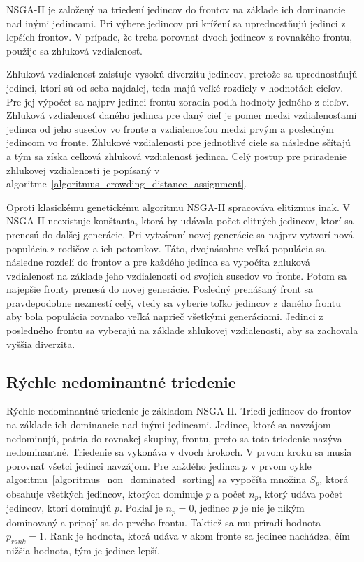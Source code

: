 NSGA-II je založený na triedení jedincov do frontov na základe ich dominancie nad inými jedincami.
Pri výbere jedincov pri krížení sa uprednostňujú jedinci z lepších frontov.
V prípade, že treba porovnať dvoch jedincov z rovnakého frontu, použije sa zhluková vzdialenosť.

Zhluková vzdialenosť zaisťuje vysokú diverzitu jedincov, pretože sa uprednostňujú jedinci, ktorí sú od seba najďalej, teda majú veľké rozdiely v hodnotách cieľov.
Pre jej výpočet sa najprv jedinci frontu zoradia podľa hodnoty jedného z cieľov.
Zhluková vzdialenosť daného jedinca pre daný cieľ je pomer medzi vzdialenosťami jedinca od jeho susedov vo fronte a vzdialenosťou medzi prvým a posledným jedincom vo fronte.
Zhlukové vzdialenosti pre jednotlivé ciele sa následne sčítajú a tým sa získa celková zhluková vzdialenosť jedinca.
Celý postup pre priradenie zhlukovej vzdialenosti je popísaný v algoritme~\ref{algoritmus_crowding_distance_assignment}.

Oproti klasickému genetickému algoritmu NSGA-II spracováva elitizmus inak.
V NSGA-II neexistuje konštanta, ktorá by udávala počet elitných jedincov, ktorí sa prenesú do ďalšej generácie.
Pri vytváraní novej generácie sa najprv vytvorí nová populácia z rodičov a ich potomkov.
Táto, dvojnásobne veľká populácia sa následne rozdelí do frontov a pre každého jedinca sa vypočíta zhluková vzdialenosť na základe jeho vzdialenosti od svojich susedov vo fronte.
Potom sa najepšie fronty prenesú do novej generácie.
Posledný prenášaný front sa pravdepodobne nezmestí celý, vtedy sa vyberie toľko jedincov z daného frontu aby bola populácia rovnako veľká naprieč všetkými generáciami.
Jedinci z posledného frontu sa vyberajú na základe zhlukovej vzdialenosti, aby sa zachovala vyššia diverzita.

\subsection*{Rýchle nedominantné triedenie}
Rýchle nedominantné triedenie je základom NSGA-II.
Triedi jedincov do frontov na základe ich dominancie nad inými jedincami.
Jedince, ktoré sa navzájom nedominujú, patria do rovnakej skupiny, frontu, preto sa toto triedenie nazýva nedominantné.
Triedenie sa vykonáva v dvoch krokoch.
V prvom kroku sa musia porovnať všetci jedinci navzájom.
Pre každého jedinca $p$ v prvom cykle algoritmu~\ref{algoritmus_non_dominated_sorting} sa vypočíta množina $S_p$, ktorá obsahuje všetkých jedincov, ktorých dominuje $p$ a počet $n_p$, ktorý udáva počet jedincov, ktorí dominujú $p$.
Pokiaľ je $n_p = 0$, jedinec $p$ je nie je nikým dominovaný a pripojí sa do prvého frontu.
Taktiež sa mu priradí hodnota $p_{rank} = 1$.
Rank je hodnota, ktorá udáva v akom fronte sa jedinec nachádza, čím nižšia hodnota, tým je jedinec lepší.


